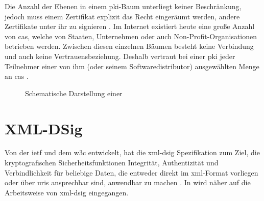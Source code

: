 Die Anzahl der Ebenen in einem \gls{pki}-Baum unterliegt keiner Beschränkung, jedoch muss einem Zertifikat explizit das Recht eingeräumt werden, andere
Zertifikate unter ihr zu signieren \cite{kits}. Im Internet existiert heute eine große Anzahl von \glspl{ca}, welche von Staaten, Unternehmen oder auch
Non-Profit-Organisationen betrieben werden. Zwischen diesen einzelnen Bäumen besteht keine Verbindung und auch keine Vertrauensbeziehung. Deshalb vertraut bei
einer \gls{pki} jeder Teilnehmer einer von ihm (oder seinem Softwaredistributor) ausgewählten Menge an \glspl{ca} \cite{ssliverse:eff}.

\begin{figure}
\centering

\caption{Schematische Darstellung einer \texorpdfstring{\protect{}}{PKI}}
\label{fig:cot}
\end{figure}

\section{XML-DSig}
\label{sec:GrundlagenDefinitionen:xml-dsig}
Von der \gls{ietf} und dem \gls{w3c} entwickelt, hat die \gls{xml-dsig} Spezifikation zum Ziel, die kryptografischen Sicherheitsfunktionen Integrität,
Authentizität und Verbindlichkeit für beliebige Daten, die entweder direkt im \gls{xml}-Format vorliegen oder über \glspl{uri} ansprechbar sind, anwendbar zu
machen \cite{krypto-pki-internet}. In  wird näher auf die Arbeitsweise von \gls{xml-dsig} eingegangen.

